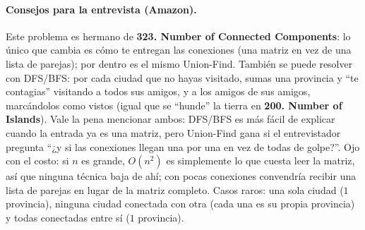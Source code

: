 \paragraph{Consejos para la entrevista (Amazon).} Este problema es hermano
de \textbf{323. Number of Connected Components}: lo único que cambia es cómo
te entregan las conexiones (una matriz en vez de una lista de parejas); por
dentro es el mismo Union-Find. También se puede resolver con DFS/BFS: por
cada ciudad que no hayas visitado, sumas una provincia y ``te contagias''
visitando a todos sus amigos, y a los amigos de sus amigos, marcándolos como
vistos (igual que se ``hunde'' la tierra en \textbf{200. Number of
Islands}). Vale la pena mencionar ambos: DFS/BFS es más fácil de explicar
cuando la entrada ya es una matriz, pero Union-Find gana si el entrevistador
pregunta ``¿y si las conexiones llegan una por una en vez de todas de
golpe?''. Ojo con el costo: si $n$ es grande, $O(n^2)$ es simplemente lo que
cuesta leer la matriz, así que ninguna técnica baja de ahí; con pocas
conexiones convendría recibir una lista de parejas en lugar de la matriz
completo. Casos raros: una sola ciudad ($1$ provincia), ninguna ciudad
conectada con otra (cada una es su propia provincia) y todas conectadas
entre sí ($1$ provincia).
